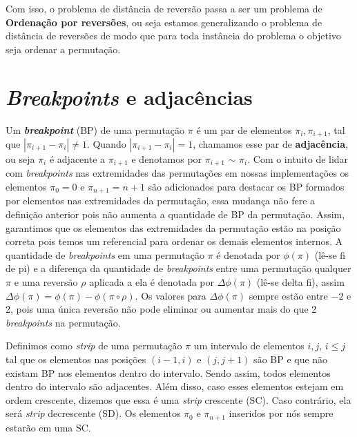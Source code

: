 Com isso, o problema de distância de reversão passa a ser um problema de \textbf{Ordenação por reversões}, ou seja estamos generalizando o problema de distância de reversões de modo que para toda instância do problema o objetivo seja ordenar a permutação.



\section{\textit{Breakpoints} e adjacências}

 Um \textbf{\textit{breakpoint}} (BP) de uma permutação $\pi$ é um par de elementos $\pi_i, \pi_{i+1}$, tal que $|\pi_{i+1} - \pi_i| \neq 1$. Quando $|\pi_{i+1} - \pi_i| = 1$, chamamos esse par de \textbf{adjacência}, ou seja $\pi_i$ é adjacente a $\pi_{i+1}$ e denotamos por $\pi_{i+1}$ $\sim$ $\pi_i$. Com o intuito de lidar com \textit{breakpoints} nas extremidades das permutações em nossas implementações os elementos $\pi_0 = 0$ e $\pi_{n+1} = n+1$ são adicionados para destacar os BP formados por elementos nas extremidades da permutação, essa mudança não fere a definição anterior pois não aumenta a quantidade de BP da permutação. Assim, garantimos que os elementos das extremidades da permutação estão na posição correta pois temos um referencial para ordenar os demais elementos internos. A quantidade de \textit{breakpoints} em uma permutação $\pi$ é denotada por $\phi(\pi)$ (lê-se fi de pi) e a diferença da quantidade de \textit{breakpoints} entre uma permutação qualquer $\pi$ e uma reversão $\rho$ aplicada a ela é  denotada por $\Delta \phi(\pi)$ (lê-se delta fi), assim $\Delta \phi(\pi) = \phi(\pi) - \phi (\pi \circ \rho)$. Os valores para  $\Delta \phi(\pi)$ sempre estão entre $-2$ e $2$, pois uma única reversão não pode eliminar ou aumentar mais do que 2 \textit{breakpoints} na permutação.
 
Definimos como \textit{strip} de uma permutação $\pi$ um intervalo de elementos $i, j$, $i \leq j$ tal que os elementos nas posições $(i-1, i)$ e $(j,j+1)$ são BP e que não existam BP nos elementos dentro do intervalo. Sendo assim, todos elementos dentro do intervalo são adjacentes. Além disso, caso esses elementos estejam em ordem crescente, dizemos que essa é uma \textit{strip} crescente (SC). Caso contrário, ela será \textit{strip} decrescente (SD). Os elementos $\pi_0$ e $\pi_{n+1}$ inseridos por nós sempre estarão em uma SC.

